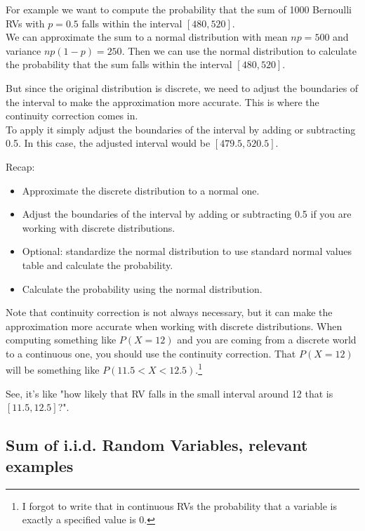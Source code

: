 \documentclass[a4paper]{article}
\begin{document}
For example we want to compute the probability that the sum of 1000 Bernoulli RVs with $p = 0.5$ falls within the interval $[480, 520]$.\\ 
We can approximate the sum to a normal distribution with mean $np = 500$ and variance $np(1-p) = 250$. Then we can use the normal distribution to calculate the probability that the sum falls within the interval $[480, 520]$. 

But since the original distribution is discrete, we need to adjust the boundaries of the interval to make the approximation more accurate. This is where the continuity correction comes in.\\
To apply it simply adjust the boundaries of the interval by adding or subtracting 0.5. In this case, the adjusted interval would be $[479.5, 520.5]$.

Recap:
\begin{itemize}
    \item Approximate the discrete distribution to a normal one.
    \item Adjust the boundaries of the interval by adding or subtracting 0.5 if you are working with discrete distributions.
    \item Optional: standardize the normal distribution to use standard normal values table and calculate the probability.
    \item Calculate the probability using the normal distribution.
\end{itemize}

Note that continuity correction is not always necessary, but it can make the approximation more accurate when working with discrete distributions.
When computing something like $P(X=12)$ and you are coming from a discrete world to a continuous one, you should use the continuity correction. That $P(X=12)$ will be something like $P(11.5 < X < 12.5)$.\footnote{I forgot to write that in continuous RVs the probability that a variable is exactly a specified value is 0.} 

See, it's like "how likely that RV falls in the small interval around 12 that is $[11.5, 12.5]$?".



\subsection{Sum of i.i.d. Random Variables, relevant examples}
\end{document}
